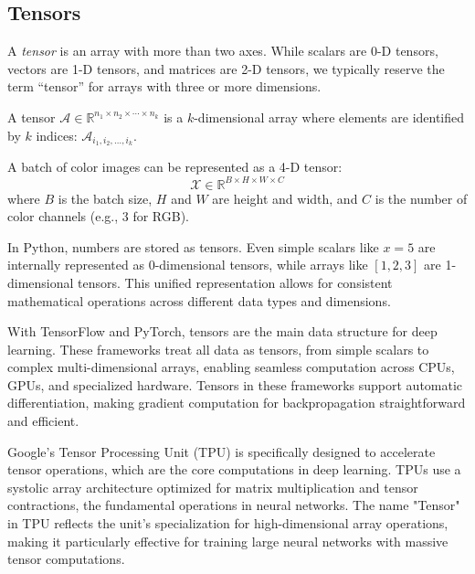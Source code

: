 \subsection{Tensors}

A \emph{tensor} is an array with more than two axes. While scalars are 0-D tensors, vectors are 1-D tensors, and matrices are 2-D tensors, we typically reserve the term ``tensor'' for arrays with three or more dimensions.

\begin{definition}[Tensor]
A tensor $\mathcal{A} \in \mathbb{R}^{n_1 \times n_2 \times \cdots \times n_k}$ is a $k$-dimensional array where elements are identified by $k$ indices: $\mathcal{A}_{i_1, i_2, \ldots, i_k}$.
\end{definition}

\begin{example}
A batch of color images can be represented as a 4-D tensor:
\begin{equation}
    \mathcal{X} \in \mathbb{R}^{B \times H \times W \times C}
\end{equation}
where $B$ is the batch size, $H$ and $W$ are height and width, and $C$ is the number of color channels (e.g., 3 for RGB).
\end{example}

\begin{remark}
In Python, numbers are stored as tensors. Even simple scalars like $x = 5$ are internally represented as 0-dimensional tensors, while arrays like $[1, 2, 3]$ are 1-dimensional tensors. This unified representation allows for consistent mathematical operations across different data types and dimensions.
\end{remark}

\begin{remark}
With TensorFlow and PyTorch, tensors are the main data structure for deep learning. These frameworks treat all data as tensors, from simple scalars to complex multi-dimensional arrays, enabling seamless computation across CPUs, GPUs, and specialized hardware. Tensors in these frameworks support automatic differentiation, making gradient computation for backpropagation straightforward and efficient.
\end{remark}

\begin{remark}
Google's Tensor Processing Unit (TPU) is specifically designed to accelerate tensor operations, which are the core computations in deep learning. TPUs use a systolic array architecture optimized for matrix multiplication and tensor contractions, the fundamental operations in neural networks. The name "Tensor" in TPU reflects the unit's specialization for high-dimensional array operations, making it particularly effective for training large neural networks with massive tensor computations.
\end{remark}

